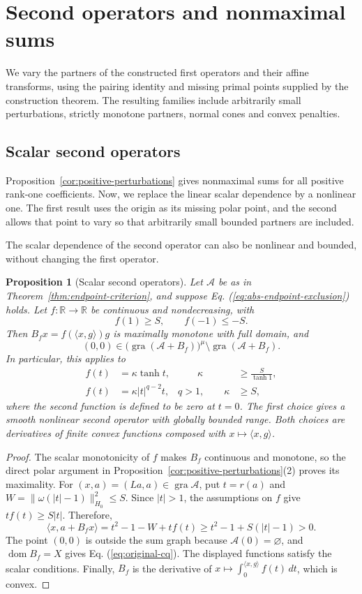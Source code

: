 \documentclass[11pt]{article}
\newcommand{\R}{\mathbb R}
\newcommand{\gra}{\operatorname{gra}}
\newcommand{\dom}{\operatorname{dom}}
\newcommand{\pair}[2]{\langle #1,#2\rangle}
\newtheorem{proposition}{Proposition}
\theoremstyle{definition}
\theoremstyle{remark}
\begin{document}
\section{Second operators and nonmaximal sums}
\label{app:partners}

We vary the partners of the constructed first operators and their affine transforms, using the pairing identity and missing primal points supplied by the construction theorem. The resulting families include arbitrarily small perturbations, strictly monotone partners, normal cones and convex penalties.

\subsection{Scalar second operators}
\label{subsec:counterexample-families}

Proposition~\ref{cor:positive-perturbations} gives nonmaximal sums for all positive rank-one coefficients. Now, we replace the linear scalar dependence by a nonlinear one. The first result uses the origin as its missing polar point, and the second allows that point to vary so that arbitrarily small bounded partners are included.

The scalar dependence of the second operator can also be nonlinear and bounded, without changing the first operator.

\begin{proposition}[Scalar second operators]
\label{cor:scalar-partners}
Let $\mathcal A$ be as in Theorem~\ref{thm:endpoint-criterion}, and suppose Eq. (\ref{eq:abs-endpoint-exclusion}) holds. Let $f:\R\to\R$ be continuous and nondecreasing, with
\[
f(1)\ge S,\qquad f(-1)\le-S.
\]
Then $B_f x=f(\pair{x}{g})g$ is maximally monotone with full domain, and
\[
(0,0)\in\bigl(\gra(\mathcal A+B_f)\bigr)^\mu\setminus\gra(\mathcal A+B_f).
\]
In particular, this applies to
\[
\begin{aligned}
f(t)&=\kappa\tanh t,&\qquad \kappa&\ge\frac{S}{\tanh1},\\
f(t)&=\kappa|t|^{q-2}t,& q>1,\qquad \kappa&\ge S,
\end{aligned}
\]
where the second function is defined to be zero at $t=0$. The first choice gives a smooth nonlinear second operator with globally bounded range. Both choices are derivatives of finite convex functions composed with $x\mapsto\pair{x}{g}$.
\end{proposition}
\begin{proof}
The scalar monotonicity of $f$ makes $B_f$ continuous and monotone, so the direct polar argument in Proposition~\ref{cor:positive-perturbations}(2) proves its maximality. For $(x,a)=(La,a)\in\gra\mathcal A$, put $t=r(a)$ and $W=\|\omega(|t|-1)\|_{H_0}^2\le S$. Since $|t|>1$, the assumptions on $f$ give $tf(t)\ge S|t|$. Therefore,
\[
\pair{x}{a+B_fx}=t^2-1-W+tf(t)
\ge t^2-1+S(|t|-1)>0.
\]
The point $(0,0)$ is outside the sum graph because $\mathcal A(0)=\varnothing$, and $\dom B_f=X$ gives Eq. (\ref{eq:original-cq}). The displayed functions satisfy the scalar conditions. Finally, $B_f$ is the derivative of $x\mapsto\int_0^{\pair{x}{g}}f(t)\,dt$, which is convex.
\end{proof}
\end{document}
